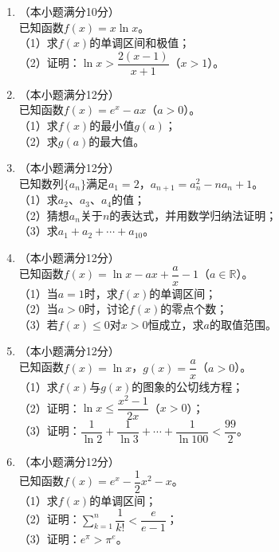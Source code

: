 \documentclass[12pt, a4paper]{ctexart}
\begin{document}
\begin{enumerate}[label=\arabic*.]

\item （本小题满分10分）\\
已知函数$f(x)=x\ln x$。\\
（1）求$f(x)$的单调区间和极值；\\
（2）证明：$\ln x>\dfrac{2(x-1)}{x+1}$（$x>1$）。
\vspace{6cm}

\item （本小题满分12分）\\
已知函数$f(x)=e^x-ax$（$a>0$）。\\
（1）求$f(x)$的最小值$g(a)$；\\
（2）求$g(a)$的最大值。
\vspace{6cm}

\item （本小题满分12分）\\
已知数列$\{a_n\}$满足$a_1=2$，$a_{n+1}=a_n^2-na_n+1$。\\
（1）求$a_2$、$a_3$、$a_4$的值；\\
（2）猜想$a_n$关于$n$的表达式，并用数学归纳法证明；\\
（3）求$a_1+a_2+\cdots+a_{10}$。
\vspace{6cm}

\item （本小题满分12分）\\
已知函数$f(x)=\ln x-ax+\dfrac{a}{x}-1$（$a\in\mathbb{R}$）。\\
（1）当$a=1$时，求$f(x)$的单调区间；\\
（2）当$a>0$时，讨论$f(x)$的零点个数；\\
（3）若$f(x)\leq 0$对$x>0$恒成立，求$a$的取值范围。
\vspace{6cm}

\item （本小题满分12分）\\
已知函数$f(x)=\ln x$，$g(x)=\dfrac{a}{x}$（$a>0$）。\\
（1）求$f(x)$与$g(x)$的图象的公切线方程；\\
（2）证明：$\ln x\leq\dfrac{x^2-1}{2x}$（$x>0$）；\\
（3）证明：$\dfrac{1}{\ln 2}+\dfrac{1}{\ln 3}+\cdots+\dfrac{1}{\ln 100}<\dfrac{99}{2}$。
\vspace{6cm}

\item （本小题满分12分）\\
已知函数$f(x)=e^x-\dfrac{1}{2}x^2-x$。\\
（1）求$f(x)$的单调区间；\\
（2）证明：$\displaystyle\sum_{k=1}^{n}\dfrac{1}{k!}<\dfrac{e}{e-1}$；\\
（3）证明：$e^{\pi}>\pi^e$。
\vspace{6cm}

\end{enumerate}
\end{document}
